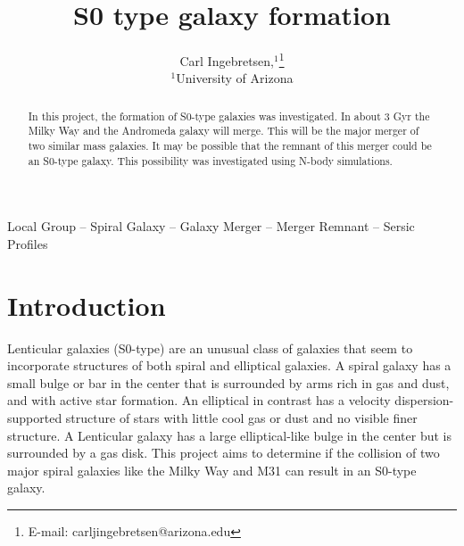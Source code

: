 \documentclass[fleqn,usenatbib]{mnras}
\title[S0 type galaxy formation]{S0 type galaxy formation}
\author[Carl Ingebretsen]{
Carl Ingebretsen,$^{1}$\thanks{E-mail: carljingebretsen@arizona.edu}
\\
$^{1}$University of Arizona\\
}
\begin{document}
\label{firstpage}
\pagerange{\pageref{firstpage}--\pageref{lastpage}}
\maketitle

\begin{abstract}
In this project, the formation of S0-type galaxies was investigated. In about 3 Gyr the Milky Way and the Andromeda galaxy will merge. This will be the major merger of two similar mass galaxies. It may be possible that the remnant of this merger could be an S0-type galaxy. This possibility was investigated using N-body simulations.
\end{abstract}

\begin{keywords}
Local Group -- Spiral Galaxy -- Galaxy Merger -- Merger Remnant -- Sersic Profiles
\end{keywords}



\section{Introduction}
Lenticular galaxies (S0-type) are an unusual class of galaxies that seem to incorporate structures of both spiral and elliptical galaxies. A spiral galaxy has a small bulge or bar in the center that is surrounded by arms rich in gas and dust, and with active star formation. An elliptical in contrast has a velocity dispersion-supported structure of stars with little cool gas or dust and no visible finer structure. A Lenticular galaxy has a large elliptical-like bulge in the center but is surrounded by a gas disk. This project aims to determine if the collision of two major spiral galaxies like the Milky Way and M31 can result in an S0-type galaxy.

\end{document}
